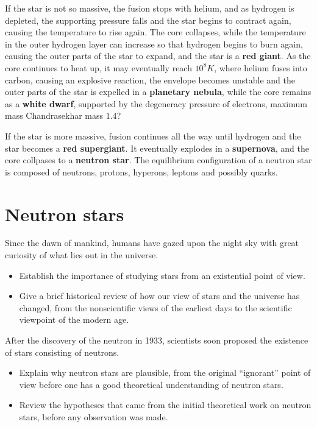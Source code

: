 If the star is not so massive, the fusion stops with helium, and as hydrogen is depleted, the supporting pressure falls and the star begins to contract again, causing the temperature to rise again.
The core collapses, while the temperature in the outer hydrogen layer can increase so that hydrogen begins to burn again, causing the outer parts of the star to expand, and the star is a \textbf{red giant}.
As the core continues to heat up, it may eventually reach $10^8 K$, where helium fuses into carbon, causing an explosive reaction, the envelope becomes unstable and the outer parts of the star is expelled in a \textbf{planetary nebula}, while the core remains as a \textbf{white dwarf}, supported by the degeneracy pressure of electrons, maximum mass Chandrasekhar mass $1.4$?

If the star is more massive, fusion continues all the way until hydrogen and the star becomes a \textbf{red supergiant}.
It eventually explodes in a \textbf{supernova}, and the core collpases to a \textbf{neutron star}.
The equilibrium configuration of a neutron star is composed of neutrons, protons, hyperons, leptons and possibly quarks.

\section*{Neutron stars}


Since the dawn of mankind, humans have gazed upon the night sky with great curiosity of what lies out in the universe.
\begin{itemize}
\item Establish the importance of studying stars from an existential point of view.
\item Give a brief historical review of how our view of stars and the universe has changed, from the nonscientific views of the earliest days to the scientific viewpoint of the modern age.
\end{itemize}

After the discovery of the neutron in 1933, scientists soon proposed the existence of stars consisting of neutrons.
\begin{itemize}
\item Explain why neutron stars are plausible, from the original ``ignorant'' point of view before one has a good theoretical understanding of neutron stars.
\item Review the hypotheses that came from the initial theoretical work on neutron stars, before any observation was made.
\end{itemize}

